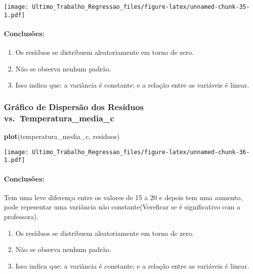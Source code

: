 \documentclass[
]{article}
\newenvironment{Shaded}{\begin{snugshade}}{\end{snugshade}}
\newcommand{\FunctionTok}[1]{\textcolor[rgb]{0.13,0.29,0.53}{\textbf{#1}}}
\newcommand{\NormalTok}[1]{#1}
\providecommand{\tightlist}{%
  \setlength{\itemsep}{0pt}\setlength{\parskip}{0pt}}
\begin{document}
\texttt{[image: Ultimo\_Trabalho\_Regressao\_files/figure-latex/unnamed-chunk-35-1.pdf]}

\hypertarget{conclusuxf5es-1}{%
\paragraph{Conclusões:}\label{conclusuxf5es-1}}

\begin{enumerate}
\def\labelenumi{\arabic{enumi}.}
\tightlist
\item
  Os resíduos se distribuem aleatoriamente em torno de zero.
\item
  Não se observa nenhum padrão.
\item
  Isso indica que: a variância é constante; e a relação entre as
  variáveis é linear.
\end{enumerate}

\hypertarget{gruxe1fico-de-dispersuxe3o-dos-resuxedduos-vs.-temperatura_media_c}{%
\subsubsection{Gráfico de Dispersão dos Resíduos
vs.~Temperatura\_media\_c}\label{gruxe1fico-de-dispersuxe3o-dos-resuxedduos-vs.-temperatura_media_c}}

\begin{Shaded}
\begin{Highlighting}[]
\FunctionTok{plot}\NormalTok{(temperatura\_media\_c, residuos)}
\end{Highlighting}
\end{Shaded}

\texttt{[image: Ultimo\_Trabalho\_Regressao\_files/figure-latex/unnamed-chunk-36-1.pdf]}

\hypertarget{conclusuxf5es-2}{%
\paragraph{Conclusões:}\label{conclusuxf5es-2}}

Tem uma leve diferença entre os valores de 15 a 20 e depois tem uma
aumento, pode repesentar uma variância não constante(Vereficar se é
significativo com a professora).

\begin{enumerate}
\def\labelenumi{\arabic{enumi}.}
\tightlist
\item
  Os resíduos se distribuem aleatoriamente em torno de zero.
\item
  Não se observa nenhum padrão.
\item
  Isso indica que: a variância é constante; e a relação entre as
  variáveis é linear.
\end{enumerate}
\end{document}

